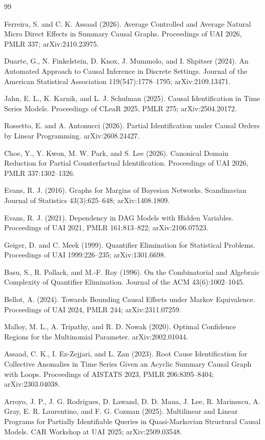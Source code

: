 \documentclass{article}
\begin{document}
\begin{thebibliography}{99}

   Ferreira, S. and C. K. Assaad (2026). Average Controlled and Average Natural Micro Direct Effects in Summary Causal Graphs. Proceedings of UAI 2026, PMLR 337; arXiv:2410.23975.

   Duarte, G., N. Finkelstein, D. Knox, J. Mummolo, and I. Shpitser (2024). An Automated Approach to Causal Inference in Discrete Settings. Journal of the American Statistical Association 119(547):1778--1795; arXiv:2109.13471.

   Jahn, E. L., K. Karnik, and L. J. Schulman (2025). Causal Identification in Time Series Models. Proceedings of CLeaR 2025, PMLR 275; arXiv:2504.20172.

   Rossetto, E. and A. Antonucci (2026). Partial Identification under Causal Orders by Linear Programming. arXiv:2608.24427.

   Choe, Y., Y. Kwon, M. W. Park, and S. Lee (2026). Canonical Domain Reduction for Partial Counterfactual Identification. Proceedings of UAI 2026, PMLR 337:1302--1326.

   Evans, R. J. (2016). Graphs for Margins of Bayesian Networks. Scandinavian Journal of Statistics 43(3):625--648; arXiv:1408.1809.

   Evans, R. J. (2021). Dependency in DAG Models with Hidden Variables. Proceedings of UAI 2021, PMLR 161:813--822; arXiv:2106.07523.

   Geiger, D. and C. Meek (1999). Quantifier Elimination for Statistical Problems. Proceedings of UAI 1999:226--235; arXiv:1301.6698.

   Basu, S., R. Pollack, and M.-F. Roy (1996). On the Combinatorial and Algebraic Complexity of Quantifier Elimination. Journal of the ACM 43(6):1002--1045.

   Bellot, A. (2024). Towards Bounding Causal Effects under Markov Equivalence. Proceedings of UAI 2024, PMLR 244; arXiv:2311.07259.

   Malloy, M. L., A. Tripathy, and R. D. Nowak (2020). Optimal Confidence Regions for the Multinomial Parameter. arXiv:2002.01044.

   Assaad, C. K., I. Ez-Zejjari, and L. Zan (2023). Root Cause Identification for Collective Anomalies in Time Series Given an Acyclic Summary Causal Graph with Loops. Proceedings of AISTATS 2023, PMLR 206:8395--8404; arXiv:2303.04038.

   Arroyo, J. P., J. G. Rodrigues, D. Lawand, D. D. Maua, J. Lee, R. Marinescu, A. Gray, E. R. Laurentino, and F. G. Cozman (2025). Multilinear and Linear Programs for Partially Identifiable Queries in Quasi-Markovian Structural Causal Models. CAR Workshop at UAI 2025; arXiv:2509.03548.

\end{thebibliography}
\end{document}
